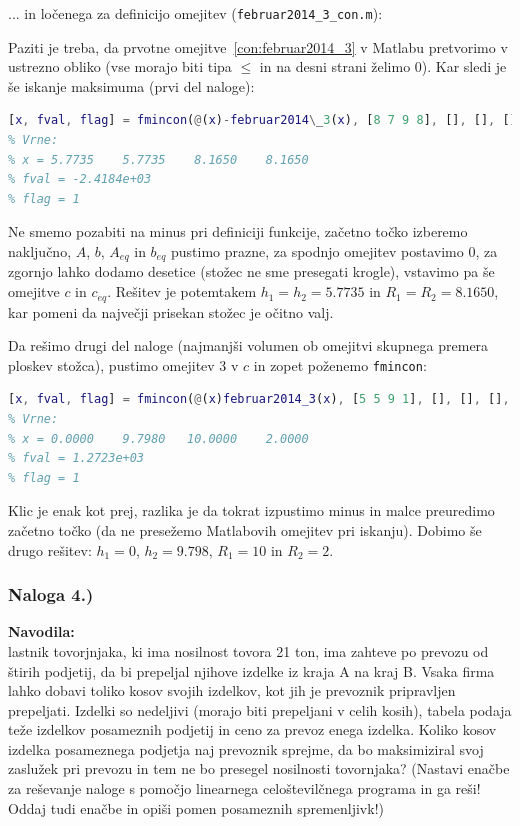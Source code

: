 \documentclass[a4paper,11pt]{article}
\begin{document}

... in ločenega za definicijo omejitev (\texttt{februar2014\_3\_con.m}):

Paziti je treba, da prvotne omejitve~\ref{con:februar2014_3} v Matlabu pretvorimo v ustrezno obliko (vse morajo biti tipa $\leq$ in na desni strani želimo 0).
Kar sledi je še iskanje maksimuma (prvi del naloge):
\begin{lstlisting}[language=Matlab]
[x, fval, flag] = fmincon(@(x)-februar2014\_3(x), [8 7 9 8], [], [], [], [], zeros(1,4), [10 10 10 10], @(x)februar2014\_3\_con(x))
% Vrne:
% x = 5.7735    5.7735    8.1650    8.1650
% fval = -2.4184e+03
% flag = 1
\end{lstlisting}
Ne smemo pozabiti na minus pri definiciji funkcije, začetno točko izberemo naključno, $A$, $b$, $A_{eq}$ in $b_{eq}$ pustimo prazne, za spodnjo omejitev postavimo 0, za zgornjo lahko dodamo desetice (stožec ne sme presegati krogle), vstavimo pa še omejitve $c$ in $c_{eq}$. Rešitev je potemtakem $h_1 = h_2 = 5.7735$ in $R_1 = R_2 = 8.1650$, kar pomeni da največji prisekan stožec je očitno valj.

Da rešimo drugi del naloge (najmanjši volumen ob omejitvi skupnega premera ploskev stožca), pustimo omejitev 3 v $c$ in zopet poženemo \texttt{fmincon}:
\begin{lstlisting}[language=Matlab]
[x, fval, flag] = fmincon(@(x)februar2014_3(x), [5 5 9 1], [], [], [], [], zeros(1,4), [10 10 10 10], @(x)februar2014_3_con(x))
% Vrne:
% x = 0.0000    9.7980   10.0000    2.0000
% fval = 1.2723e+03
% flag = 1
\end{lstlisting}
Klic je enak kot prej, razlika je da tokrat izpustimo minus in malce preuredimo začetno točko (da ne presežemo Matlabovih omejitev pri iskanju). Dobimo še drugo rešitev: $h_1 = 0$, $h_2 = 9.798$, $R_1=10$ in $R_2=2$.


\subsubsection{Naloga 4.)}

\textbf{Navodila:} \\
lastnik tovorjnjaka, ki ima nosilnost tovora 21 ton, ima zahteve po prevozu od štirih podjetij, da bi prepeljal njihove izdelke iz kraja A na kraj B. Vsaka firma
lahko dobavi toliko kosov svojih izdelkov, kot jih je prevoznik pripravljen prepeljati. Izdelki so nedeljivi (morajo biti prepeljani v celih kosih), tabela podaja
teže izdelkov posameznih podjetij in ceno za prevoz enega izdelka. Koliko kosov izdelka posameznega podjetja naj prevoznik sprejme, da bo maksimiziral
svoj zaslužek pri prevozu in tem ne bo presegel nosilnosti tovornjaka? (Nastavi enačbe za reševanje naloge s pomočjo linearnega celoštevilčnega programa in 
ga reši! Oddaj tudi enačbe in opiši pomen posameznih spremenljivk!)
\end{document}
